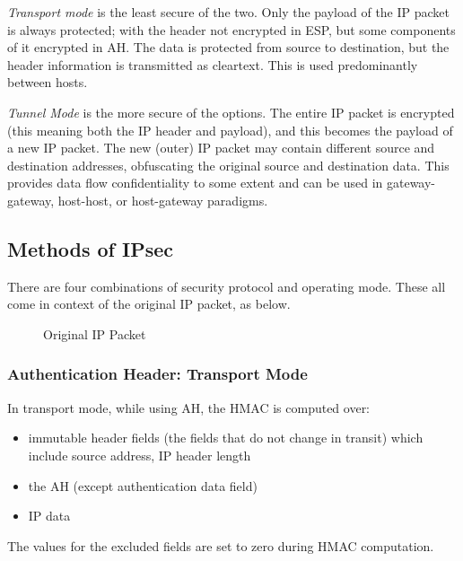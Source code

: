 \textit{Transport mode} is the least secure of the two. Only the payload of the IP packet is always protected; with the header not encrypted in ESP, but some components of it encrypted in AH. The data is protected from source to destination, but the header information is transmitted as cleartext. This is used predominantly between hosts. 

\textit{Tunnel Mode} is the more secure of the options. The entire IP packet is encrypted (this meaning both the IP header and payload), and this becomes the payload of a new IP packet. The new (outer) IP packet may contain different source and destination addresses, obfuscating the original source and destination data. This provides data flow confidentiality to some extent and can be used in gateway-gateway, host-host, or host-gateway paradigms. 

\subsection{Methods of IPsec}

There are four combinations of security protocol and operating mode. These all come in context of the original IP packet, as below.
\begin{figure}[H]
    \centering
    \caption{Original IP Packet}
\end{figure}

\subsubsection{Authentication Header: Transport Mode}
In transport mode, while using AH, the HMAC is computed over:
\begin{itemize}
    \item immutable header fields (the fields that do not change in transit) which include source address, IP header length
    \item the AH (except authentication data field)
    \item IP data
\end{itemize}
The values for the excluded fields are set to zero during HMAC computation.

